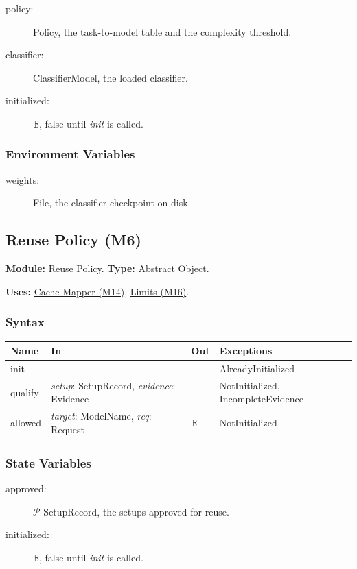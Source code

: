 \documentclass[12pt, titlepage]{article}
\begin{document}
\begin{description}
\item[policy:] Policy, the task-to-model table and the complexity threshold.
\item[classifier:] ClassifierModel, the loaded classifier.
\item[initialized:] $\mathbb{B}$, false until \emph{init} is called.
\end{description}

\subsubsection*{Environment Variables}

\begin{description}
\item[weights:] File, the classifier checkpoint on disk.
\end{description}

\newpage
\subsection{Reuse Policy (M6)}\label{mReuse}

\textbf{Module:} Reuse Policy. \textbf{Type:} Abstract Object.

\textbf{Uses:} \hyperref[mMap]{Cache Mapper (M14)}, \hyperref[mLimits]{Limits (M16)}.

\subsubsection*{Syntax}

\begin{tabularx}{\textwidth}{l X l X}
\toprule
\textbf{Name} & \textbf{In} & \textbf{Out} & \textbf{Exceptions}\\
\midrule
init & -- & -- & AlreadyInitialized\\
qualify & \emph{setup}: SetupRecord, \emph{evidence}: Evidence & -- & NotInitialized, IncompleteEvidence\\
allowed & \emph{target}: ModelName, \emph{req}: Request & $\mathbb{B}$ & NotInitialized\\
\bottomrule
\end{tabularx}

\subsubsection*{State Variables}

\begin{description}
\item[approved:] $\mathcal{P}$ SetupRecord, the setups approved for reuse.
\item[initialized:] $\mathbb{B}$, false until \emph{init} is called.
\end{description}
\end{document}
